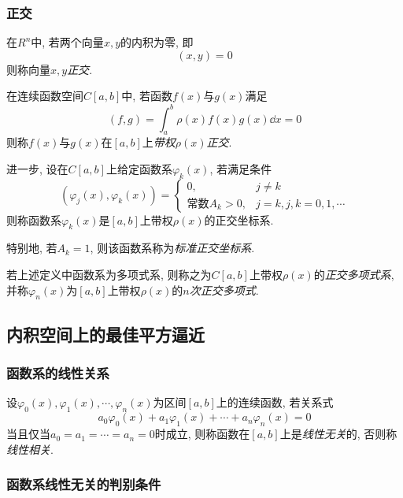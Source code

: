 \subsubsection{正交}

在$R^n$中, 若两个向量$x,y$的内积为零, 即
\begin{equation*}
    (x,y)=0
\end{equation*}
则称向量$x,y$\emph{正交}.

在连续函数空间$C[a,b]$中, 若函数$f(x)$与$g(x)$满足
\begin{equation*}
    (f,g)=\int_a^b\rho(x)f(x)g(x)\dd{x}=0
\end{equation*}
则称$f(x)$与$g(x)$在$[a,b]$上\emph{带权$\rho(x)$正交}.

进一步, 设在$C[a,b]$上给定函数系${\varphi_k(x)}$, 若满足条件
\begin{equation*}
    (\varphi_j(x),\varphi_k(x))=\begin{cases}
        0,&j\ne k\\
        \text{常数}A_k>0,&j=k, j,k=0,1,\cdots
    \end{cases}
\end{equation*}
则称函数系${\varphi_k(x)}$是$[a,b]$上带权$\rho(x)$的正交坐标系.

特别地, 若$A_k=1$, 则该函数系称为\emph{标准正交坐标系}.

若上述定义中函数系为多项式系, 则称之为$C[a,b]$上带权$\rho(x)$的\emph{正交多项式系}, 并称$\varphi_n(x)$为$[a,b]$上带权$\rho(x)$的\emph{$n$次正交多项式}.

\subsection{内积空间上的最佳平方逼近}

\subsubsection{函数系的线性关系}

\begin{definition}
    设$\varphi_0(x),\varphi_1(x),\cdots,\varphi_n(x)$为区间$[a,b]$上的连续函数, 若关系式
    \begin{equation*}
        a_0\varphi_0(x)+a_1\varphi_1(x)+\cdots+a_n\varphi_n(x)=0
    \end{equation*}
    当且仅当$a_0=a_1=\cdots=a_n=0$时成立, 则称函数在$[a,b]$上是\emph{线性无关}的, 否则称\emph{线性相关}.
\end{definition}

\subsubsection{函数系线性无关的判别条件}


